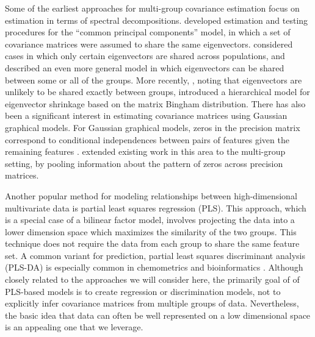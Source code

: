 \documentclass[12pt]{article}
\begin{document}
Some of the earliest approaches for multi-group covariance estimation
focus on estimation in terms of spectral decompositions.
\cite{Flury1987} developed estimation and testing procedures for the
``common principal components'' model, in which a set of covariance
matrices were assumed to share the same eigenvectors.
\citet{Schott1991, Schott1999} considered cases in which only certain
eigenvectors are shared across populations, and \citet{Boik2002}
described an even more general model in which eigenvectors can be
shared between some or all of the groups.  More recently,
\citet{Hoff2009}, noting that eigenvectors are unlikely to be shared
exactly between groups, introduced a hierarchical model for
eigenvector shrinkage based on the matrix Bingham distribution.  There
has also been a significant interest in estimating covariance matrices
using Gaussian graphical models. For Gaussian graphical models, zeros
in the precision matrix correspond to conditional independences
between pairs of features given the remaining features
\citep{Meinshausen2006}.  \citet{Witten2014} extended existing work in
this area to the multi-group setting, by pooling information about the
pattern of zeros across precision matrices.


Another popular method for modeling relationships between
high-dimensional multivariate data is partial least squares regression
(PLS). This approach, which is a special case of a bilinear factor
model, involves projecting the data into a lower dimension space which
maximizes the similarity of the two groups.  This technique does not
require the data from each group to share the same feature set.  A
common variant for prediction, partial least squares discriminant
analysis (PLS-DA) is especially common in chemometrics and
bioinformatics \citep{Barker2003} .  Although closely related to the
approaches we will consider here, the primarily goal of of PLS-based
models is to create regression or discrimination models, not to
explicitly infer covariance matrices from multiple groups of data.
Nevertheless, the basic idea that data can often be well represented
on a low dimensional space is an appealing one that we leverage.
\end{document}
